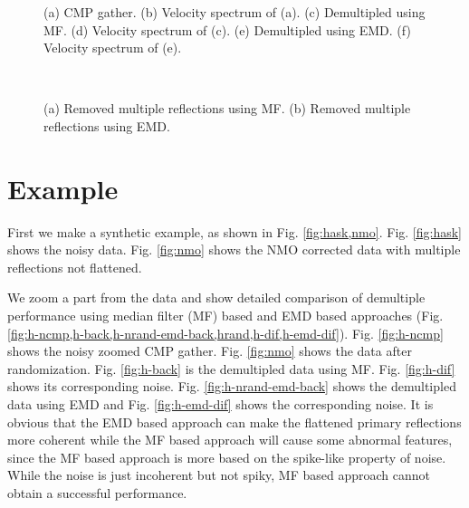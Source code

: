 \begin{figure}[ht!]
  \centering
   \caption{(a) CMP gather. (b) Velocity spectrum of (a). (c) Demultipled using MF. (d) Velocity spectrum of (c). (e) Demultipled using EMD.   (f) Velocity spectrum of (e).  }
   \label{fig:cmp0,demul-mf,demul-emd,vscan,vscan-mf,vscan-emd}
\end{figure}

\begin{figure}[htb!]
  \centering
  \\ 
    \caption{(a) Removed multiple reflections using MF. (b) Removed multiple reflections using EMD.}
   \label{fig:vscan-mf,vscan-emd}    
\end{figure}    
    
\section{Example}
First we make a synthetic example, as shown in Fig. \ref{fig:hask,nmo}. Fig. \ref{fig:hask} shows the noisy data. Fig. \ref{fig:nmo} shows the NMO corrected data with multiple reflections not flattened. 

We zoom a part from the data and show detailed comparison of demultiple performance using median filter (MF) based and EMD based approaches (Fig. \ref{fig:h-ncmp,h-back,h-nrand-emd-back,hrand,h-dif,h-emd-dif}). Fig. \ref{fig:h-ncmp} shows the noisy zoomed CMP gather. Fig. \ref{fig:nmo} shows the data after randomization.  Fig. \ref{fig:h-back} is the demultipled data using MF. Fig. \ref{fig:h-dif} shows its corresponding noise. Fig. \ref{fig:h-nrand-emd-back} shows the demultipled data using EMD and Fig. \ref{fig:h-emd-dif} shows the corresponding noise. It is obvious that the EMD based approach can make the flattened primary reflections more coherent while the MF based approach will cause some abnormal features, since the MF based approach is more based on the spike-like property of noise. While the noise is just incoherent but not spiky, MF based approach cannot obtain a successful performance. 

